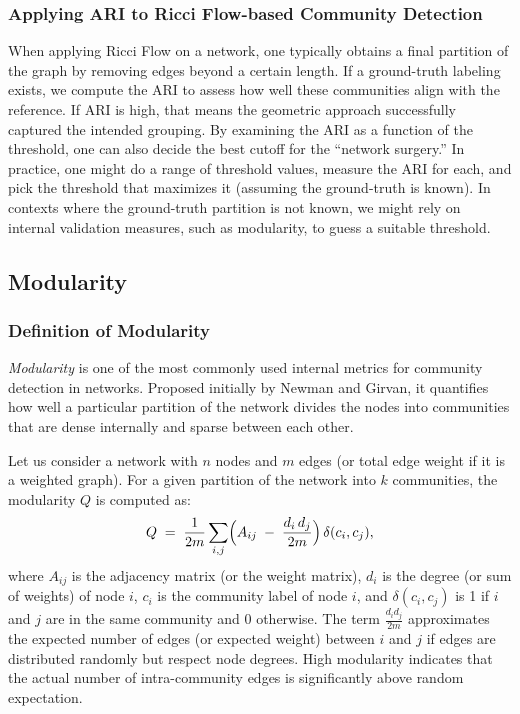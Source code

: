 \subsubsection{Applying ARI to Ricci Flow-based Community Detection}
When applying Ricci Flow on a network, one typically obtains a final partition of the graph by removing edges beyond a certain length. If a ground-truth labeling exists, we compute the ARI to assess how well these communities align with the reference. If $\mathrm{ARI}$ is high, that means the geometric approach successfully captured the intended grouping. By examining the ARI as a function of the threshold, one can also decide the best cutoff for the “network surgery.” In practice, one might do a range of threshold values, measure the ARI for each, and pick the threshold that maximizes it (assuming the ground-truth is known). In contexts where the ground-truth partition is not known, we might rely on internal validation measures, such as modularity, to guess a suitable threshold.

\subsection{Modularity}
\label{subsec:modularity_definition}

\subsubsection{Definition of Modularity}
\emph{Modularity} is one of the most commonly used internal metrics for community detection in networks. Proposed initially by Newman and Girvan, it quantifies how well a particular partition of the network divides the nodes into communities that are dense internally and sparse between each other.

Let us consider a network with $n$ nodes and $m$ edges (or total edge weight if it is a weighted graph). For a given partition of the network into $k$ communities, the modularity $Q$ is computed as:
\[
Q \;=\;\frac{1}{2m} \sum_{i,j}\Bigl(A_{ij} \;-\;\frac{d_i\,d_j}{2m}\Bigr) \,\delta(c_i, c_j),
\]
where $A_{ij}$ is the adjacency matrix (or the weight matrix), $d_i$ is the degree (or sum of weights) of node $i$, $c_i$ is the community label of node $i$, and $\delta(c_i, c_j)$ is 1 if $i$ and $j$ are in the same community and 0 otherwise. The term $\frac{d_i d_j}{2m}$ approximates the expected number of edges (or expected weight) between $i$ and $j$ if edges are distributed randomly but respect node degrees. High modularity indicates that the actual number of intra-community edges is significantly above random expectation.

